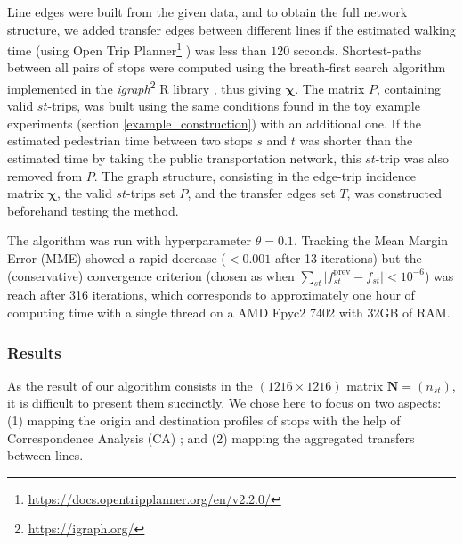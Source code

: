 \documentclass{bmcart}
\begin{document}
Line edges were built from the given data, and to obtain the full network structure, we added transfer edges between different lines if the estimated walking time (using Open Trip Planner\footnote{\url{https://docs.opentripplanner.org/en/v2.2.0/}} \cite{MalcolmMorgan2019}) was less than $120$ seconds. Shortest-paths between all pairs of stops were computed using the breath-first search algorithm \cite{west2001introduction} implemented in the \emph{igraph}\footnote{\url{https://igraph.org/}} R library \cite{Csardi2006}, thus giving $\bm{\chi}$. The matrix $P$, containing valid $st$-trips, was built using the same conditions found in the toy example experiments (section \ref{example_construction}) with an additional one. If the estimated pedestrian time between two stops $s$ and $t$ was shorter than the estimated time by taking the public transportation network, this $st$-trip was also removed from $P$. The graph structure, consisting in the edge-trip incidence matrix $\bm{\chi}$, the valid $st$-trips set $P$, and the transfer edges set $T$, was constructed beforehand testing the method.

The algorithm was run with hyperparameter $\theta = 0.1$. Tracking the Mean Margin Error (MME) showed a rapid decrease ($<0.001$ after 13 iterations) but the (conservative) convergence criterion (chosen as when $\sum_{st} \vert f^\text{prev}_{st} - f_{st} \vert< 10^{-6} $) was reach after 316 iterations, which corresponds to approximately one hour of computing time with a single thread on a AMD Epyc2 7402 with 32GB of RAM.

\subsubsection{Results}
\label{real_results}

As the result of our algorithm consists in the $(1216 \times 1216)$ matrix $\mathbf{N} = (n_{st})$, it is difficult to present them succinctly. We chose here to focus on two aspects: (1) mapping the origin and destination profiles of stops with the help of Correspondence Analysis (CA) \cite{benzecri1977histoire}; and (2) mapping the aggregated transfers between lines.
\end{document}
